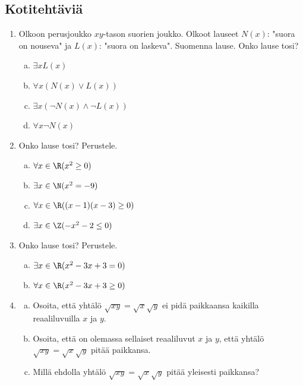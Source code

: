 \subsection*{Kotitehtäviä}

\begin{enumerate}

\item Olkoon perusjoukko $xy$-tason suorien joukko. Olkoot
lauseet $N(x)$: "suora on nouseva" ja $L(x)$: "suora on laskeva".
Suomenna lause. Onko lause tosi?
\begin{enumerate}[a)]
\item $\exists x L(x)$
\item $\forall x (N(x) \lor L(x))$
\item $\exists x (\lnot N(x) \land \lnot L(x))$
\item $\forall x \lnot N(x)$
\end{enumerate}

\newpage

\item Onko lause tosi? Perustele.
\begin{enumerate}[a)]
\item $\forall x\in\R (x^2 \ge 0)$
\item $\exists x\in\N (x^2 = -9)$
\item $\forall x\in\R ((x-1)(x-3) \ge 0)$
\item $\exists x\in\Z (-x^2 - 2 \le 0)$
\end{enumerate}

\item Onko lause tosi? Perustele.
\begin{enumerate}[a)]
\item $\exists x\in \R (x^2 - 3x + 3 = 0)$
\item $\forall x\in \R (x^2 - 3x + 3 \ge 0)$
\end{enumerate}

\item
\begin{enumerate}[a)]
\item Osoita, että yhtälö $\sqrt{xy} = \sqrt{x}\sqrt{y}$ ei
pidä paikkaansa kaikilla reaaliluvuilla $x$ ja $y$.
\item Osoita, että on olemassa sellaiset reaaliluvut $x$ ja
$y$, että yhtälö $\sqrt{xy} = \sqrt{x}\sqrt{y}$ pitää paikkansa.
\item Millä ehdolla yhtälö $\sqrt{xy} = \sqrt{x}\sqrt{y}$
pitää yleisesti paikkansa?
\end{enumerate}


\end{enumerate}
